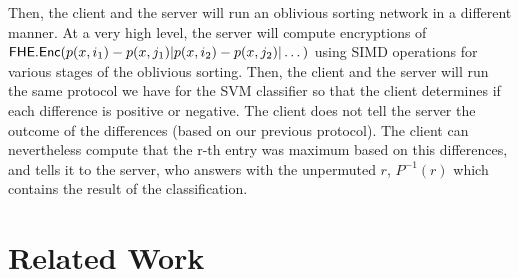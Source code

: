 \documentclass[11pt]{article}
\begin{document}
 Then, the client and the server will run an oblivious sorting network in a different manner. At a very high level, the server will compute encryptions of $\mathsf{FHE.Enc}(p(x, i_1) - p(x, j_1) | p(x, i_2) - p(x, j_2) | \dots )$ using SIMD operations for various stages of the oblivious sorting. Then, the client and the server will run the same protocol we have for the SVM classifier so that the client determines if each difference is positive or negative.  The client does not tell the server the outcome of the differences (based on our previous protocol). The client can nevertheless compute that the r-th entry was maximum based on this differences, and tells it to the server, who answers with the unpermuted $r$, $P^{-1}(r)$ which contains the result of the classification.
  
\section{Related Work} %
\label{sec:related_work}
        
\end{document}
